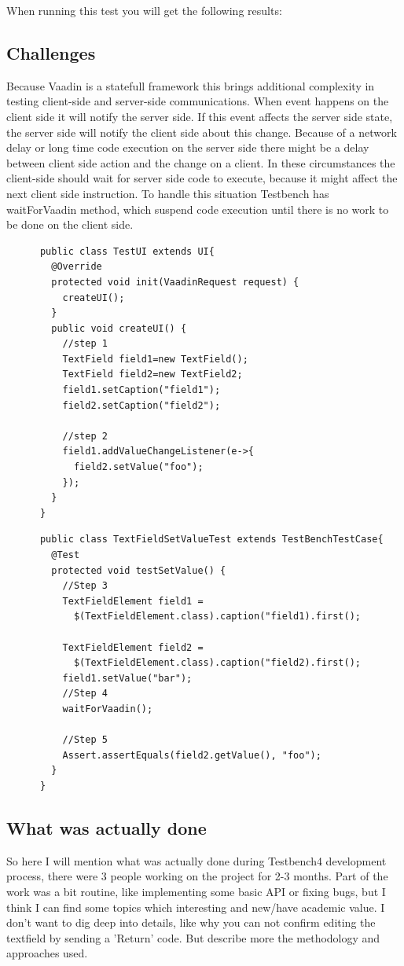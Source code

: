\documentclass{article}
\begin{document}
	When running this test you will get the following results:
\subsection {Challenges}
Because Vaadin is a statefull framework this brings additional complexity in
testing client-side and server-side communications. When event happens on the client side 
it will notify the server side. If this event affects the server side state, the
server side will notify the client side about this change.
 Because of a network delay or long time code execution on the server side there might be a delay between 
 client side action and the change on a client.  
 In these circumstances the client-side should wait for server side code to execute,
  because it might affect the next client side instruction.
  To handle this situation Testbench has waitForVaadin method, which suspend code execution until 
  there is no work to be done on the client side.
      
  
    \lstset{language=Java}
    \begin{lstlisting}
      public class TestUI extends UI{
        @Override
        protected void init(VaadinRequest request) {
          createUI();
        }
        public void createUI() {
          //step 1 
          TextField field1=new TextField();
          TextField field2=new TextField2;
          field1.setCaption("field1");
          field2.setCaption("field2");
          
          //step 2
          field1.addValueChangeListener(e->{
            field2.setValue("foo");
          });
        }
      }
    \end{lstlisting}  
    
    \lstset{language=Java}
    \begin{lstlisting}
      public class TextFieldSetValueTest extends TestBenchTestCase{
        @Test
        protected void testSetValue() {
          //Step 3
          TextFieldElement field1 =
            $(TextFieldElement.class).caption("field1).first();
            
          TextFieldElement field2 =
            $(TextFieldElement.class).caption("field2).first();  
          field1.setValue("bar");
          //Step 4
          waitForVaadin();
          
          //Step 5
          Assert.assertEquals(field2.getValue(), "foo");           
        }
      }
    \end{lstlisting}  
     \subsection {What was actually done}
      So here I will mention what was actually done during Testbench4
      development process, there were 3 people working on the project for 2-3
      months. Part of the work was a bit routine, like implementing some basic
      API or fixing bugs, but I think I can find some topics which interesting
      and new/have academic value. I don't want to dig deep into details, like
      why you can not confirm editing the textfield by sending a 'Return' code.
      But describe more the methodology and approaches used.
      
\end{document}
